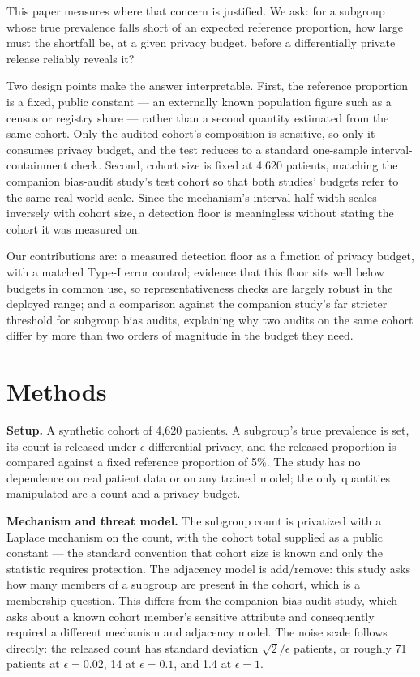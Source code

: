 \documentclass[11pt]{article}
\begin{document}
This paper measures where that concern is justified. We ask: for a subgroup whose true prevalence falls short of an expected reference proportion, how large must the shortfall be, at a given privacy budget, before a differentially private release reliably reveals it?

Two design points make the answer interpretable. First, the reference proportion is a fixed, public constant --- an externally known population figure such as a census or registry share --- rather than a second quantity estimated from the same cohort. Only the audited cohort's composition is sensitive, so only it consumes privacy budget, and the test reduces to a standard one-sample interval-containment check. Second, cohort size is fixed at 4,620 patients, matching the companion bias-audit study's test cohort so that both studies' budgets refer to the same real-world scale. Since the mechanism's interval half-width scales inversely with cohort size, a detection floor is meaningless without stating the cohort it was measured on.

Our contributions are: a measured detection floor as a function of privacy budget, with a matched Type-I error control; evidence that this floor sits well below budgets in common use, so representativeness checks are largely robust in the deployed range; and a comparison against the companion study's far stricter threshold for subgroup bias audits, explaining why two audits on the same cohort differ by more than two orders of magnitude in the budget they need.

\section{Methods}

\textbf{Setup.} A synthetic cohort of 4,620 patients. A subgroup's true prevalence is set, its count is released under $\epsilon$-differential privacy, and the released proportion is compared against a fixed reference proportion of 5\%. The study has no dependence on real patient data or on any trained model; the only quantities manipulated are a count and a privacy budget.

\textbf{Mechanism and threat model.} The subgroup count is privatized with a Laplace mechanism \cite{dwork2006} on the count, with the cohort total supplied as a public constant --- the standard convention that cohort size is known and only the statistic requires protection. The adjacency model is add/remove: this study asks how many members of a subgroup are present in the cohort, which is a membership question. This differs from the companion bias-audit study, which asks about a known cohort member's sensitive attribute and consequently required a different mechanism and adjacency model. The noise scale follows directly: the released count has standard deviation $\sqrt{2}/\epsilon$ patients, or roughly 71 patients at $\epsilon = 0.02$, 14 at $\epsilon = 0.1$, and 1.4 at $\epsilon = 1$.
\end{document}
